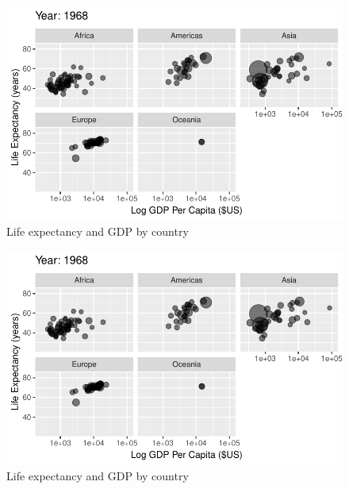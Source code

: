 \documentclass[
  letterpaper,
  DIV=11,
  numbers=noendperiod]{scrreport}
\theoremstyle{definition}
\theoremstyle{remark}
\begin{document}
\begin{figure}

{\centering \includegraphics{index_files/figure-pdf/fig-anim-lifegdp-29.pdf}

}

\caption{\label{fig-anim-lifegdp-29}Life expectancy and GDP by country}

\end{figure}

\begin{figure}

{\centering \includegraphics{index_files/figure-pdf/fig-anim-lifegdp-30.pdf}

}

\caption{\label{fig-anim-lifegdp-30}Life expectancy and GDP by country}

\end{figure}
\end{document}
